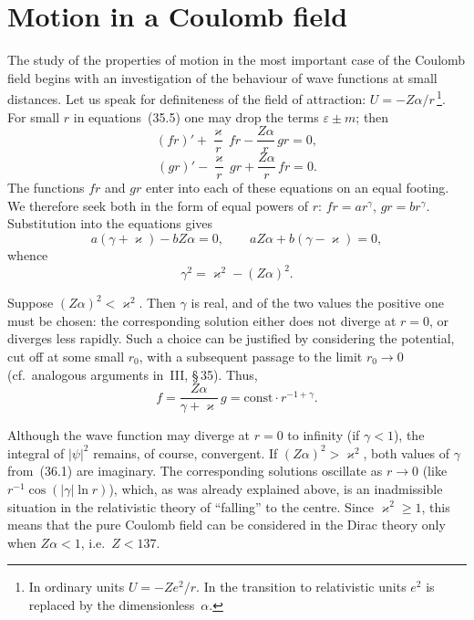 \section{Motion in a Coulomb field}

The study of the properties of motion in the most important case of the Coulomb field begins with an investigation of the behaviour of wave functions at small distances. Let us speak for definiteness of the field of attraction: $U = -Z\alpha/r$\,\footnote{In ordinary units $U = -Ze^2/r$. In the transition to relativistic units $e^2$ is replaced by the dimensionless~$\alpha$.}. For small $r$ in equations~(35.5) one may drop the terms $\varepsilon \pm m$; then
\[
(fr)' + \frac{\varkappa}{r}\,fr - \frac{Z\alpha}{r}\,gr = 0,
\]
\[
(gr)' - \frac{\varkappa}{r}\,gr + \frac{Z\alpha}{r}\,fr = 0.
\]
The functions $fr$ and $gr$ enter into each of these equations on an equal footing. We therefore seek both in the form of equal powers of $r$: $fr = ar^\gamma$, $gr = br^\gamma$. Substitution into the equations gives
\[
a(\gamma + \varkappa) - bZ\alpha = 0,\qquad aZ\alpha + b(\gamma - \varkappa) = 0,
\]
whence
\begin{equation}
\gamma^2 = \varkappa^2 - (Z\alpha)^2.
\tag{36.1}
\end{equation}

Suppose $(Z\alpha)^2 < \varkappa^2$. Then $\gamma$ is real, and of the two values the positive one must be chosen: the corresponding solution either does not diverge at $r = 0$, or diverges less rapidly. Such a choice can be justified by considering the potential, cut off at some small $r_0$, with a subsequent passage to the limit $r_0 \to 0$ (cf.\ analogous arguments in~III, \S\,35). Thus,
\begin{equation}
f = \frac{Z\alpha}{\gamma + \varkappa}\,g = \mathrm{const}\cdot r^{-1+\gamma}.
\tag{36.2}
\end{equation}

Although the wave function may diverge at $r = 0$ to infinity (if $\gamma < 1$), the integral of $|\psi|^2$ remains, of course, convergent. If $(Z\alpha)^2 > \varkappa^2$, both values of $\gamma$ from~(36.1) are imaginary. The corresponding solutions oscillate as $r \to 0$ (like $r^{-1}\cos(|\gamma|\ln r)$), which, as was already explained above, is an inadmissible situation in the relativistic theory of ``falling'' to the centre. Since $\varkappa^2 \geqslant 1$, this means that the pure Coulomb field can be considered in the Dirac theory only when $Z\alpha < 1$, i.e.\ $Z < 137$.

